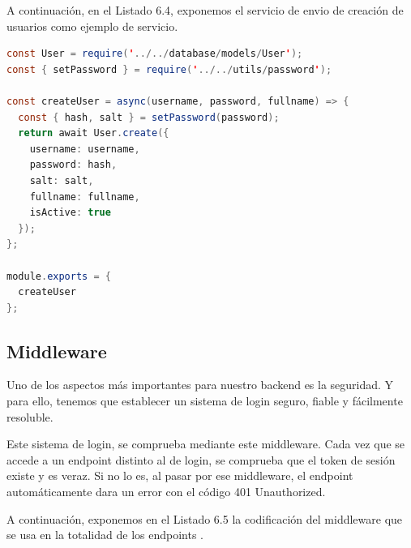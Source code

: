 A continuación, en el Listado 6.4, exponemos el servicio de envio de creación de usuarios como ejemplo de servicio.

\begin{lstlisting}[language=Java,caption={Servicio de Creación de Usuario},captionpos=b]
const User = require('../../database/models/User');
const { setPassword } = require('../../utils/password');

const createUser = async(username, password, fullname) => {
  const { hash, salt } = setPassword(password);
  return await User.create({
    username: username,
    password: hash,
    salt: salt,
    fullname: fullname,
    isActive: true
  });
};

module.exports = {
  createUser
};
\end{lstlisting}

\subsection{Middleware}
Uno de los aspectos más importantes para nuestro backend es la seguridad. Y para ello, tenemos que establecer un sistema de login seguro, fiable y fácilmente resoluble.

Este sistema de login, se comprueba mediante este middleware. Cada vez que se accede a un endpoint distinto al de login, se comprueba que el token de sesión existe y es veraz. Si no lo es, al pasar por ese middleware, el endpoint automáticamente dara un error con el código 401 Unauthorized.

A continuación, exponemos en el Listado 6.5 la codificación del middleware que se usa en la totalidad de los endpoints \cite{endpoint}.

